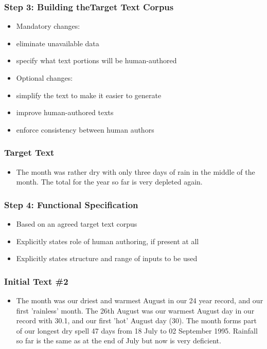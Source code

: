 \documentclass[compress,color=usenames]{beamer}
\begin{document}
\begin{frame}
\frametitle{Step 3: Building theTarget Text Corpus}

\begin{itemize}
\item { {Mandatory changes:}}
\item { {eliminate unavailable data}}
\item { {specify what text portions will be human-authored}}
\item { {Optional changes:}}
\item { {simplify the text to make it easier to generate }}
\item { {improve human-authored texts}}
\item { {enforce consistency between human authors}}
\end{itemize}

\end{frame}

\begin{frame}
\frametitle{Target Text}

\begin{itemize}
\item { {The month was rather dry with only three days of rain in the middle of the month. The total for the year so far is very depleted again.}}
\end{itemize}

\end{frame}

\begin{frame}
\frametitle{Step 4: Functional Specification}

\label{f104}
\begin{itemize}
\item { {Based on an agreed target text corpus}}
\item { {Explicitly states role of human authoring, if present at all}}
\item { {Explicitly states structure and range of inputs to be used}}
\end{itemize}

\end{frame}

\begin{frame}
\frametitle{Initial Text \#2}

\label{f106}
\begin{itemize}
\item { {The month was our driest and warmest August in our 24 year record, and our first 'rainless' month. The 26th August was our warmest August day in our record with 30.1, and our first 'hot' August day (30). The month forms part of our longest dry spell 47 days from 18 July to 02 September 1995. Rainfall so far is the same as at the end of July but now is very deficient.}}
\end{itemize}

\end{frame}
\end{document}
